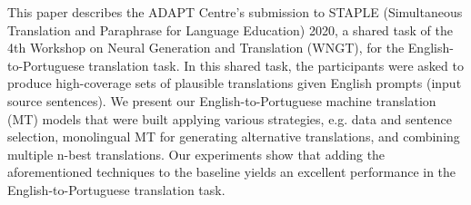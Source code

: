 This paper describes the ADAPT Centre's submission to STAPLE (Simultaneous Translation and Paraphrase for Language Education) 2020, a shared task of the 4th Workshop on Neural Generation and Translation (WNGT), for the English-to-Portuguese translation task. In this shared task, the participants were asked to produce high-coverage sets of plausible translations given English prompts (input source sentences). We present our English-to-Portuguese machine translation (MT) models that were built applying various strategies, e.g. data and sentence selection, monolingual MT for generating alternative translations, and combining multiple n-best translations. Our experiments show that adding the aforementioned techniques to the baseline yields an excellent performance in the English-to-Portuguese translation task.
